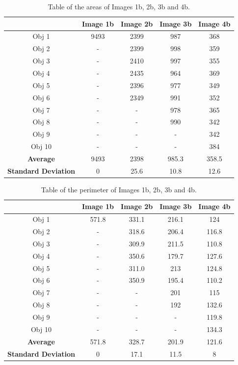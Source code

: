 \documentclass[runningheads]{llncs}
\begin{document}
\begin{table}[h!]
\centering
\begin{tabular}{|c|c|c|c|c|}
\hline
\textbf{} & \textbf{Image 1b} & \textbf{Image 2b} & \textbf{Image 3b} & \textbf{Image 4b} \\
\hline
Obj 1 & 9493      & 2399  & 987 &  368 \\ \hline
Obj 2 &    -        & 2399  & 998 &  359\\ \hline
Obj 3 &   -         & 2410  & 997 &  355\\ \hline
Obj 4 &   -         & 2435  & 964 &  369\\ \hline
Obj 5 &   -         & 2396  & 977 &  349\\ \hline
Obj 6 &   -         & 2349  & 991 &  352\\ \hline
Obj 7 &    -        &   -    & 978 &  365\\ \hline
Obj 8 &   -         &   -    & 990 &  342 \\ \hline
Obj 9 &    -        &   -    &  -    & 342\\ \hline
Obj 10 &   -         &   -   &  -    & 384\\ \hline
\textbf{Average} &   9493    &  2398      &   985.3   & 358.5  \\ \hline
\textbf{Standard Deviation} &  0      &  25.6      &    10.8   & 12.6  \\ \hline
\end{tabular}
\caption{Table of the areas of Images 1b, 2b, 3b and 4b.}
\label{tab:Area-Series B}
\end{table}

\begin{table}[h!]
\centering
\begin{tabular}{|c|c|c|c|c|}
\hline
\textbf{} & \textbf{Image 1b} & \textbf{Image 2b} & \textbf{Image 3b} & \textbf{Image 4b} \\
\hline
Obj 1 & 571.8      & 331.1  & 216.1 &  124 \\ \hline
Obj 2 &  -          & 318.6  & 206.4 &  116.8\\ \hline
Obj 3 & -           & 309.9  & 211.5 &  110.8\\ \hline
Obj 4 & -           & 350.6  & 179.7 &  127.6\\ \hline
Obj 5 &  -          & 311.0  & 213 &  124.8\\ \hline
Obj 6 &  -          & 350.9  & 195.4 &  110.2\\ \hline
Obj 7 &  -          &    -   & 201 &  115\\ \hline
Obj 8 &  -          &   -    & 192 &  132.6 \\ \hline
Obj 9 &  -          &   -    &  -    & 119.8\\ \hline
Obj 10 &  -          &   -    & -     & 134.3\\ \hline
\textbf{Average} &   571.8    &  328.7      &   201.9   & 121.6 \\ \hline
\textbf{Standard Deviation} &  0      &  17.1     &   11.5   & 8  \\ \hline
\end{tabular}
\caption{Table of the perimeter of Images 1b, 2b, 3b and 4b.}
\label{tab:Perimeter-Series B}
\end{table}
\end{document}

